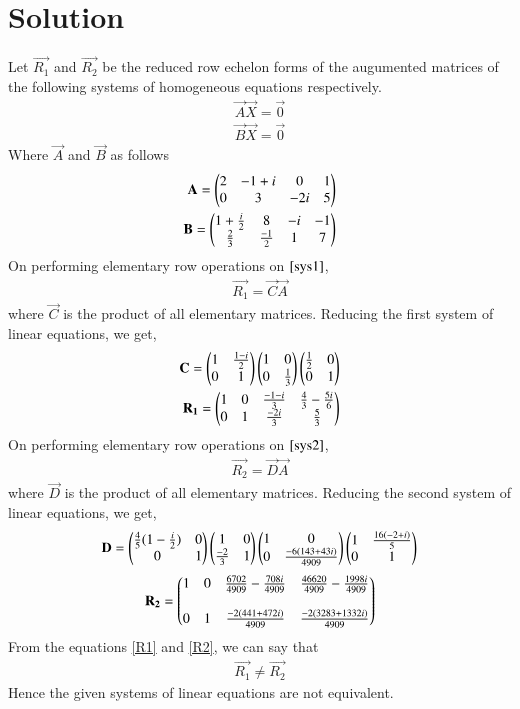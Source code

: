 \documentclass[journal,12pt,twocolumn]{IEEEtran}
\begin{document}
\section{Solution}
Let $\vec{R_1}$ and  $\vec{R_2}$ be the reduced row echelon forms of the  augumented matrices of the following systems of homogeneous equations respectively.
\begin{align}
\vec{A}\vec{X}=\vec{0}\label{f1}\\
\vec{B}\vec{X}=\vec{0}\label{f2}
\end{align}
Where $\vec{A}$ and $\vec{B}$ as follows
\begin{align}
\mathbf{A}=\begin{pmatrix}2&-1+i&0&1\\0&3&-2i&5\end{pmatrix}\label{sys1}\\
\mathbf{B}=\begin{pmatrix}1+\frac{i}{2}&8&-i&-1\\\frac{2}{3}&\frac{-1}{2}&1&7\end{pmatrix}\label{sys2}
\end{align}
On performing elementary row operations on $\eqref{sys1}$,
\begin{align}
\vec{R_1}=\vec{C}\vec{A}
\end{align}
where $\vec{C}$ is the product of all elementary matrices. Reducing the first system of linear equations, we get,
\begin{align}
\mathbf{C}=\begin{pmatrix}1&\frac{1-i}{2}\\0&1\end{pmatrix}\begin{pmatrix}1&0\\0&\frac{1}{3}\end{pmatrix}\begin{pmatrix}\frac{1}{2}&0\\0&1\end{pmatrix}\\
\mathbf{R_1}=\begin{pmatrix}1&0&\frac{-1-i}{3}&\frac{4}{3}-\frac{5i}{6}\\0&1&\frac{-2i}{3}&\frac{5}{3}\end{pmatrix}\label{R1}
\end{align}
On performing elementary row operations on $\eqref{sys2}$,
\begin{align}
\vec{R_2}=\vec{D}\vec{A}
\end{align}
where $\vec{D}$ is the product of all elementary matrices. Reducing the second system of linear equations, we get,
\begin{align}
\mathbf{D}=\begin{pmatrix}\frac{4}{5}(1-\frac{i}{2})&0\\0&1\end{pmatrix}\begin{pmatrix}1&0\\\frac{-2}{3}&1\end{pmatrix}\begin{pmatrix}1&0\\0&\frac{-6(143+43i)}{4909}\end{pmatrix}\begin{pmatrix}1&\frac{16(-2+i)}{5}\\0&1\end{pmatrix}
\end{align}
\begin{align}
\mathbf{R_2}=\begin{pmatrix}1&0&\frac{6702}{4909}-\frac{708i}{4909}&\frac{46620}{4909}-\frac{1998i}{4909}\\\\0&1&\frac{-2(441+472i)}{4909}&\frac{-2(3283+1332i)}{4909}\end{pmatrix}\label{R2}
\end{align}
From the equations \eqref{R1} and \eqref{R2}, we can say that 
\begin{align}
\vec{R_1}\neq\vec{R_2}
\end{align}
Hence the given systems of linear equations are not equivalent.
\end{document}
